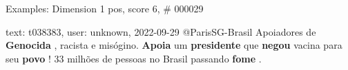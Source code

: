 \begin{frame}{Examples: Dimension 1 pos, score 6, \# 000029}
\footnotesize
\begin{exampleblock}{text: t038383, user: unknown, 2022-09-29}
@ParisSG-Brasil Apoiadores de \textbf{Genocida} , racista e misógino. 
\textbf{Apoia} um \textbf{presidente} que \textbf{negou} vacina para seu 
\textbf{povo} ! 33 milhões de pessoas no Brasil passando \textbf{fome} . 
\end{exampleblock}
\end{frame}
